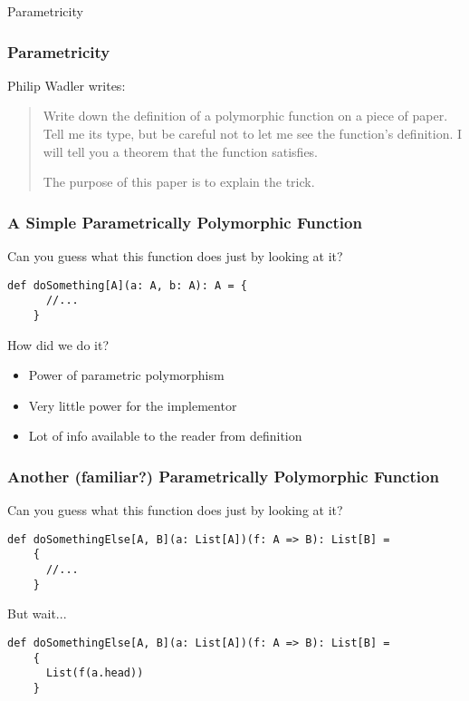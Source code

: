\begin{section}{Parametricity}
\begin{frame}
\frametitle{Parametricity}
\begin{block}{Philip Wadler \cite{Wadler89theoremsfor} writes:}
\begin{quotation}
Write down the definition of a polymorphic function on a piece of paper. Tell me its type, but be careful not to let me see the function's definition. I will tell you a theorem that the function satisfies.

The purpose of this paper is to explain the trick.
\end{quotation}
\end{block}
\end{frame}

\begin{frame}[fragile]
\frametitle{A Simple Parametrically Polymorphic Function}
  Can you guess what this function does just by looking at it?
  \begin{lstlisting}[style=scala]
    def doSomething[A](a: A, b: A): A = {
      //...
    }
  \end{lstlisting}
\end{frame}

\begin{frame}{How did we do it?}
  \begin{center}
    \begin{itemize}
    \item Power of parametric polymorphism
    \item Very little power for the implementor
    \item Lot of info available to the reader from definition
    \end{itemize}
\end{center}
\end{frame}

\begin{frame}[fragile]
\frametitle{Another (familiar?) Parametrically Polymorphic Function}
  Can you guess what this function does just by looking at it?
  \begin{lstlisting}[style=scala]
    def doSomethingElse[A, B](a: List[A])(f: A => B): List[B] =
    {
      //...
    }
  \end{lstlisting}
\end{frame}

\begin{frame}[fragile]{But wait...}
    \begin{lstlisting}[style=scala]
    def doSomethingElse[A, B](a: List[A])(f: A => B): List[B] =
    {
      List(f(a.head))
    }
  \end{lstlisting}
\end{frame}


\end{section}
